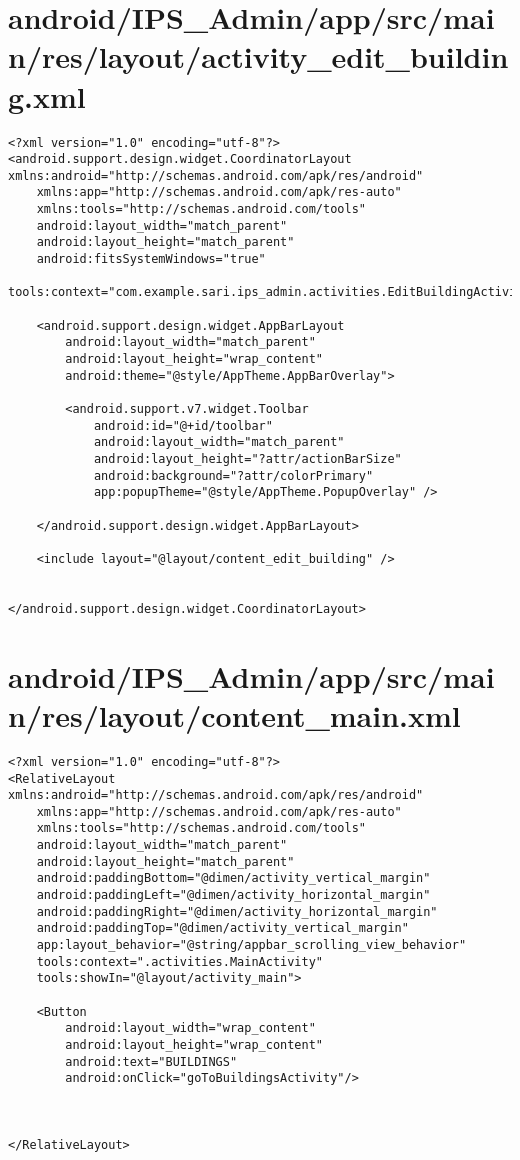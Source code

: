 \section{android/IPS\_Admin/app/src/main/res/layout/activity_edit_building.xml}
\begin{lstlisting}<?xml version="1.0" encoding="utf-8"?>
<android.support.design.widget.CoordinatorLayout xmlns:android="http://schemas.android.com/apk/res/android"
    xmlns:app="http://schemas.android.com/apk/res-auto"
    xmlns:tools="http://schemas.android.com/tools"
    android:layout_width="match_parent"
    android:layout_height="match_parent"
    android:fitsSystemWindows="true"
    tools:context="com.example.sari.ips_admin.activities.EditBuildingActivity">

    <android.support.design.widget.AppBarLayout
        android:layout_width="match_parent"
        android:layout_height="wrap_content"
        android:theme="@style/AppTheme.AppBarOverlay">

        <android.support.v7.widget.Toolbar
            android:id="@+id/toolbar"
            android:layout_width="match_parent"
            android:layout_height="?attr/actionBarSize"
            android:background="?attr/colorPrimary"
            app:popupTheme="@style/AppTheme.PopupOverlay" />

    </android.support.design.widget.AppBarLayout>

    <include layout="@layout/content_edit_building" />


</android.support.design.widget.CoordinatorLayout>
\end{lstlisting}
\newpage
\section{android/IPS\_Admin/app/src/main/res/layout/content_main.xml}
\begin{lstlisting}<?xml version="1.0" encoding="utf-8"?>
<RelativeLayout xmlns:android="http://schemas.android.com/apk/res/android"
    xmlns:app="http://schemas.android.com/apk/res-auto"
    xmlns:tools="http://schemas.android.com/tools"
    android:layout_width="match_parent"
    android:layout_height="match_parent"
    android:paddingBottom="@dimen/activity_vertical_margin"
    android:paddingLeft="@dimen/activity_horizontal_margin"
    android:paddingRight="@dimen/activity_horizontal_margin"
    android:paddingTop="@dimen/activity_vertical_margin"
    app:layout_behavior="@string/appbar_scrolling_view_behavior"
    tools:context=".activities.MainActivity"
    tools:showIn="@layout/activity_main">

    <Button
        android:layout_width="wrap_content"
        android:layout_height="wrap_content"
        android:text="BUILDINGS"
        android:onClick="goToBuildingsActivity"/>



</RelativeLayout>
\end{lstlisting}
\newpage
